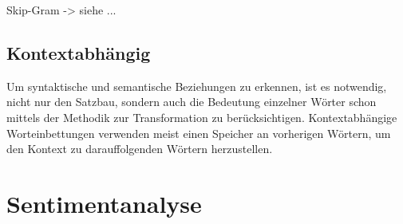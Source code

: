 Skip-Gram -> siehe ...

\subsection{Kontextabhängig}

Um syntaktische und semantische Beziehungen zu erkennen, ist es notwendig, nicht nur den Satzbau, sondern auch die Bedeutung einzelner Wörter schon mittels der Methodik zur Transformation zu berücksichtigen. Kontextabhängige Worteinbettungen verwenden meist einen Speicher an vorherigen Wörtern, um den Kontext zu darauffolgenden Wörtern herzustellen.









\section{Sentimentanalyse} \label{sec:sentimentanalysis}




